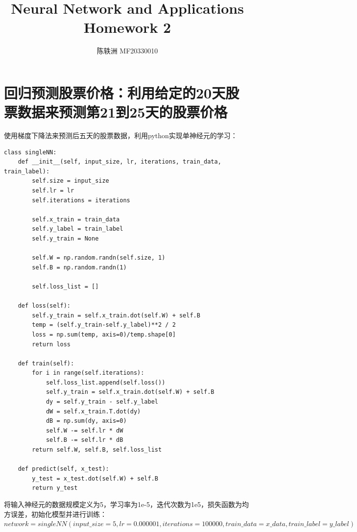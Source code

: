 \documentclass{article}
\title{Neural Network and Applications\\Homework 2}
\author{陈轶洲 MF20330010}
\begin{document}
	\maketitle
	
\section{回归预测股票价格：利用给定的20天股票数据来预测第21到25天的股票价格}
使用梯度下降法来预测后五天的股票数据，利用python实现单神经元的学习：

\begin{lstlisting}
class singleNN:
	def __init__(self, input_size, lr, iterations, train_data, train_label):
		self.size = input_size
		self.lr = lr
		self.iterations = iterations
	
		self.x_train = train_data
		self.y_label = train_label
		self.y_train = None
	
		self.W = np.random.randn(self.size, 1)
		self.B = np.random.randn(1)
	
		self.loss_list = []
	
	def loss(self):
		self.y_train = self.x_train.dot(self.W) + self.B
		temp = (self.y_train-self.y_label)**2 / 2
		loss = np.sum(temp, axis=0)/temp.shape[0]      
		return loss  
	
	def train(self):
		for i in range(self.iterations):
			self.loss_list.append(self.loss())
			self.y_train = self.x_train.dot(self.W) + self.B
			dy = self.y_train - self.y_label
			dW = self.x_train.T.dot(dy)
			dB = np.sum(dy, axis=0)
			self.W -= self.lr * dW
			self.B -= self.lr * dB
		return self.W, self.B, self.loss_list
	
	def predict(self, x_test):
		y_test = x_test.dot(self.W) + self.B
		return y_test
\end{lstlisting}

将输入神经元的数据规模定义为5，学习率为1e-5，迭代次数为1e5，损失函数为均方误差，初始化模型并进行训练：\\$ 
network = singleNN(input\_size=5, lr=0.000001, iterations=100000, train\_data=x\_data, train\_label=y\_label) $\\
\end{document}
